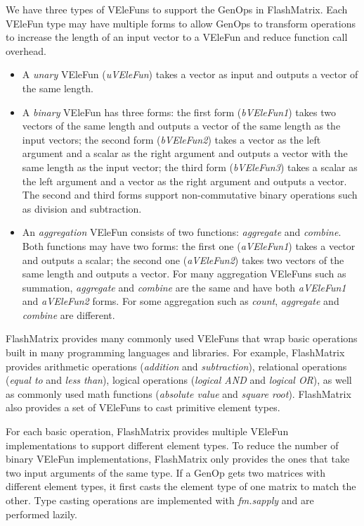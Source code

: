 We have three types of VEleFuns to support the GenOps in FlashMatrix. Each VEleFun
type may have multiple forms to allow GenOps to transform operations to
increase the length of an input vector to a VEleFun and reduce function call
overhead.
\begin{itemize}
	\item A \textit{unary} VEleFun (\textit{uVEleFun}) takes a vector
		as input and outputs a vector of the same length.
	\item A \textit{binary} VEleFun has three forms: the first form (\textit{bVEleFun1}) 
    takes two vectors of the same length and outputs
		a vector of the same length as the input vectors; the second form (\textit{bVEleFun2}) 
    takes a vector as the left argument and a scalar
		as the right argument and outputs a vector with the same length as
		the input vector; the third form (\textit{bVEleFun3}) takes a scalar
		as the left argument and a vector as the right argument and outputs
		a vector. The second and third forms support non-commutative binary
		operations such as division and subtraction.
	\item An \textit{aggregation} VEleFun consists of two functions:
		\textit{aggregate} and \textit{combine}. Both functions may have two
		forms: the first one (\textit{aVEleFun1}) takes a vector and
		outputs a scalar; the second one (\textit{aVEleFun2}) takes
		two vectors of the same length and outputs a vector. For many
		aggregation VEleFuns such as summation, \textit{aggregate} and
		\textit{combine} are the same and have both \textit{aVEleFun1} and
		\textit{aVEleFun2} forms. For some aggregation such as \textit{count},
		\textit{aggregate} and \textit{combine} are different.
\end{itemize}

FlashMatrix provides many commonly used VEleFuns that wrap basic operations
built in many programming languages and libraries. For example,
FlashMatrix provides arithmetic operations (\textit{addition} and
\textit{subtraction}), relational operations (\textit{equal to} and
\textit{less than}), logical operations (\textit{logical AND} and
\textit{logical OR}), as well as commonly used math functions (\textit{absolute
value} and \textit{square root}). FlashMatrix also provides a set of VEleFuns to
cast primitive element types.

For each basic operation, FlashMatrix provides multiple VEleFun
implementations to support different element types. To reduce the number
of binary VEleFun implementations, FlashMatrix only provides the ones that take
two input arguments of the same type. If a GenOp gets two matrices with different
element types, it first casts the element type of one matrix to match
the other. %
Type casting operations are
implemented with \textit{fm.sapply} and are performed lazily.

